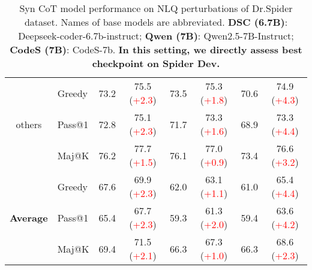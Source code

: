 \begin{table*}[t!]
\begin{adjustbox}{max width=\textwidth}
\begin{tabular}{c | l | c c | c c | c c }
        \multirow{3}{*}{others} & Greedy & 73.2 & 75.5 (\textcolor{red}{+2.3}) & 73.5 & 75.3 (\textcolor{red}{+1.8}) & 70.6 & 74.9 (\textcolor{red}{+4.3}) \\
        & Pass@1 & 72.8 & 75.1 (\textcolor{red}{+2.3}) & 71.7 & 73.3 (\textcolor{red}{+1.6}) & 68.9 & 73.3 (\textcolor{red}{+4.4}) \\
        & Maj@K & 76.2 & 77.7 (\textcolor{red}{+1.5}) & 76.1 & 77.0 (\textcolor{red}{+0.9}) & 73.4 & 76.6 (\textcolor{red}{+3.2}) \\ \midrule

        \multirow{3}{*}{\textbf{Average}} & Greedy & 67.6 & 69.9 (\textcolor{red}{+2.3}) & 62.0 & 63.1 (\textcolor{red}{+1.1}) & 61.0 & 65.4 (\textcolor{red}{+4.4}) \\
& Pass@1 & 65.4 & 67.7 (\textcolor{red}{+2.3}) & 59.3 & 61.3 (\textcolor{red}{+2.0}) & 59.4 & 63.6 (\textcolor{red}{+4.2}) \\
& Maj@K & 69.4 & 71.5 (\textcolor{red}{+2.1}) & 66.3 & 67.3 (\textcolor{red}{+1.0}) & 66.3 & 68.6 (\textcolor{red}{+2.3}) \\

        
        \bottomrule
    \end{tabular}
\end{adjustbox}
    \caption{Syn CoT model performance on NLQ perturbations of Dr.Spider dataset. Names of base models are abbreviated. \textbf{DSC (6.7B)}: Deepseek-coder-6.7b-instruct; \textbf{Qwen (7B)}: Qwen2.5-7B-Instruct; \textbf{CodeS (7B)}: CodeS-7b. \textbf{In this setting, we directly assess best checkpoint on Spider Dev.}} 
    \label{tab:drSpiderNLQCoT}
\end{table*}

